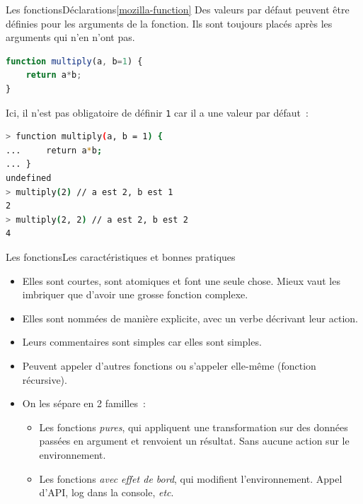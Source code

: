 \documentclass{beamer}
\begin{document}
    \begin{frame}[fragile]{Les fonctions}{Déclarations\cref{mozilla-function}}
        Des valeurs par défaut peuvent être définies pour les arguments de la fonction.
        Ils sont toujours placés après les arguments qui n'en n'ont pas.
        \begin{lstlisting}[language=JavaScript,title={\tiny{Script JavaScript}}]
function multiply(a, b=1) {
    return a*b;
}
        \end{lstlisting}
        Ici, il n'est pas obligatoire de définir \lstinline{1} car il a une valeur par défaut~:
        \begin{lstlisting}[language=Bash,title={\tiny{Node.js}}]
> function multiply(a, b = 1) {
...     return a*b;
... }
undefined
> multiply(2) // a est 2, b est 1
2
> multiply(2, 2) // a est 2, b est 2
4
        \end{lstlisting}
    \end{frame}

    \begin{frame}{Les fonctions}{Les caractéristiques et bonnes pratiques}
        \begin{itemize}
            \item Elles sont courtes, sont atomiques et font une seule chose. Mieux vaut les
            imbriquer que d'avoir une grosse fonction complexe.
            \item Elles sont nommées de manière explicite, avec un verbe décrivant leur action.
            \item Leurs commentaires sont simples car elles sont simples.
            \item Peuvent appeler d'autres fonctions ou s'appeler elle-même (fonction récursive).
            \item On les sépare en 2 familles~:
            \begin{itemize}
                \item Les fonctions \textit{pures}, qui appliquent une transformation sur des données
                passées en argument et renvoient un résultat.
                Sans aucune action sur le environnement.
                \item Les fonctions \textit{avec effet de bord}, qui modifient l'environnement.
                Appel d'API, log dans la console, \textit{etc}.
            \end{itemize}
        \end{itemize}
    \end{frame}
\end{document}
